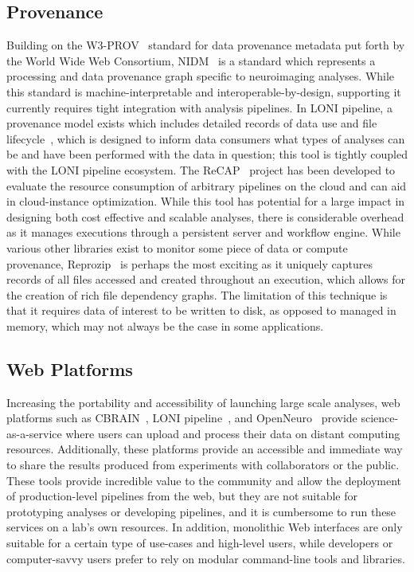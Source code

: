 \documentclass[fleqn,12pt]{SelfArx_ch} %
\begin{document}
\subsection{Provenance}
Building on the W3-PROV~\cite{Missier2013-ml} standard for data provenance metadata put forth by the World Wide Web
Consortium, NIDM~\cite{Sochat2016-gl} is a standard which represents a processing and data provenance graph specific to
neuroimaging analyses. While this standard is machine-interpretable and interoperable-by-design, supporting it
currently requires tight integration with analysis pipelines. In LONI pipeline, a provenance model exists which
includes detailed records of data use and file lifecycle~\cite{Dinov2010-yq}, which is designed to inform data
consumers what types of analyses can be and have been performed with the data in question; this tool is tightly coupled
with the LONI pipeline ecosystem. The ReCAP~\cite{Hasham2018-hn} project has been developed to evaluate the resource
consumption of arbitrary pipelines on the cloud and can aid in cloud-instance optimization. While this tool has
potential for a large impact in designing both cost effective and scalable analyses, there is considerable overhead as
it manages executions through a persistent server and workflow engine. While various other libraries exist to monitor
some piece of data or compute provenance, Reprozip~\cite{Chirigati2016-ep} is perhaps the most exciting as it uniquely
captures records of all files accessed and created throughout an execution, which allows for the creation of rich file
dependency graphs. The limitation of this technique is that it requires data of interest to be written to disk, as
opposed to managed in memory, which may not always be the case in some applications.

\subsection{Web Platforms}
Increasing the portability and accessibility of launching large scale analyses, web platforms such as
CBRAIN~\cite{Sherif2014-ve}, LONI pipeline~\cite{Rex2003-pr}, and OpenNeuro~\cite{Poldrack2013-wi} provide
science-as-a-service where users can upload and process their data on distant computing resources. Additionally, these
platforms provide an accessible and immediate way to share the results produced from experiments with collaborators or
the public. These tools provide incredible value to the community and allow the deployment of production-level
pipelines from the web, but they are not suitable for prototyping analyses or developing pipelines, and it is
cumbersome to run these services on a lab’s own resources. In addition, monolithic Web interfaces are only suitable for
a certain type of use-cases and high-level users, while developers or computer-savvy users prefer to rely on modular
command-line tools and libraries.
\end{document}
